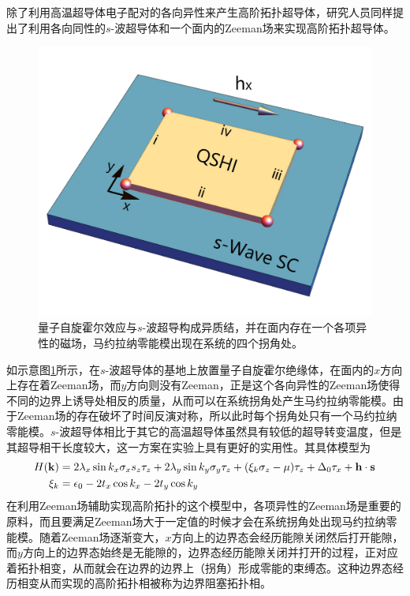  除了利用高温超导体电子配对的各向异性来产生高阶拓扑超导体，研究人员同样提出了利用各向同性的$s$-波超导体和一个面内的Zeeman场来实现高阶拓扑超导体\cite{re45}。
\begin{figure}[h]
\centering
\includegraphics[scale=0.2]{pic/fig14.pdf}
\caption{量子自旋霍尔效应与$s$-波超导构成异质结，并在面内存在一个各项异性的磁场，马约拉纳零能模出现在系统的四个拐角处。}\label{fig13}
\end{figure}
如示意图\ref{fig13}所示，在$s$-波超导体的基地上放置量子自旋霍尔绝缘体，在面内的$x$方向上存在着Zeeman场，而$y$方向则没有Zeeman，正是这个各向异性的Zeeman场使得不同的边界上诱导处相反的质量，从而可以在系统拐角处产生马约拉纳零能模。由于Zeeman场的存在破坏了时间反演对称，所以此时每个拐角处只有一个马约拉纳零能模。$s$-波超导体相比于其它的高温超导体虽然具有较低的超导转变温度，但是其超导相干长度较大，这一方案在实验上具有更好的实用性。其具体模型为
\begin{equation}
\begin{aligned}
H(\mathbf{k})&=2\lambda_x\sin k_x\sigma_xs_z\tau_z+2\lambda_y\sin k_y\sigma_y\tau_z+(\xi_k\sigma_z-\mu)\tau_z+\Delta_0\tau_x+{\bf h\cdot s}\\
\xi_k&=\epsilon_0-2t_x\cos k_x-2t_y\cos k_y\label{ze1}
\end{aligned}
\end{equation}
在利用Zeeman场辅助实现高阶拓扑的这个模型中，各项异性的Zeeman场是重要的原料，而且要满足Zeeman场大于一定值的时候才会在系统拐角处出现马约拉纳零能模。随着Zeeman场逐渐变大，$x$方向上的边界态会经历能隙关闭然后打开能隙，而$y$方向上的边界态始终是无能隙的，边界态经历能隙关闭并打开的过程，正对应着拓扑相变，从而就会在边界的边界上（拐角）形成零能的束缚态。这种边界态经历相变从而实现的高阶拓扑相被称为边界阻塞拓扑相\cite{re46}。
